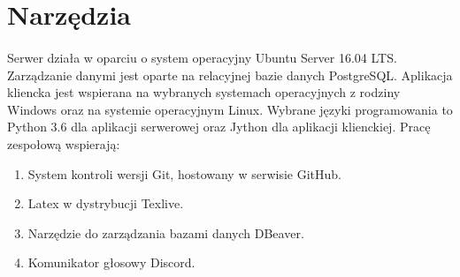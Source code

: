 \documentclass{article}
\begin{document}
  \section{Narzędzia}
  \paragraph{}Serwer działa w oparciu o system operacyjny Ubuntu Server 16.04 LTS. Zarządzanie danymi jest oparte na relacyjnej bazie danych PostgreSQL. Aplikacja kliencka jest wspierana na wybranych systemach operacyjnych z rodziny Windows oraz na systemie operacyjnym Linux. Wybrane języki programowania to Python 3.6 dla aplikacji serwerowej oraz Jython dla aplikacji klienckiej.
  Pracę zespołową wspierają:
  \begin{enumerate}
    \item System kontroli wersji Git, hostowany w serwisie GitHub.
    \item Latex w dystrybucji Texlive.
    \item Narzędzie do zarządzania bazami danych DBeaver.
    \item Komunikator głosowy Discord.
  \end{enumerate}
\end{document}
